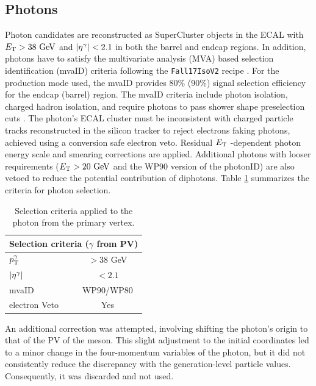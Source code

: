 
\subsection{Photons}\label{subsec:photons}
Photon candidates are reconstructed as SuperCluster objects in the ECAL with $E_\text{T} > 38\ \text{GeV}$ and $\left\lvert\eta^{\gamma}\right\rvert < 2.1$ in both the barrel and endcap regions. In addition, photons have to satisfy the multivariate analysis (MVA) based selection identification (mvaID) criteria following the \verb+Fall17IsoV2+ recipe \cite{CMS:2020uim}. For the production mode used, the mvaID provides 80\% (90\%) signal selection efficiency for the endcap (barrel) region. The mvaID criteria include photon isolation, charged hadron isolation, and require photons to pass shower shape preselection cuts \cite{Rembser:2019ijh}. The photon's ECAL cluster must be inconsistent with charged particle tracks reconstructed in the silicon tracker to reject electrons faking photons, achieved using a conversion safe electron veto. Residual $E_\text{T}$ -dependent photon energy scale and smearing corrections are applied. Additional photons with looser requirements ($E_\text{T} > 20\ \text{GeV}$ and the WP90 version of the photonID) are also vetoed to reduce the potential contribution of diphotons. Table \ref{tab:photon_selection} summarizes the criteria for photon selection.

\begin{table}[!ht]
    \centering
    \begin{tabular}{|l|c|}
        \hline
            \multicolumn{2}{|c|}{\cellcolor{lightgray}Selection criteria ($\gamma$ from PV)}\\ \hline
            $p_\text{T}^{\gamma}$            &$>38$ GeV\\
            $\left\lvert\eta^{\gamma}\right\rvert$       &$<2.1$ \\
            mvaID                       &WP90/WP80 \\
            electron Veto               &Yes \\\hline
        \end{tabular}
    \caption{Selection criteria applied to the photon from the primary vertex.}
    \label{tab:photon_selection}
\end{table}

An additional correction was attempted, involving shifting the photon's origin to that of the PV of the meson. This slight adjustment to the initial coordinates led to a minor change in the four-momentum variables of the photon, but it did not consistently reduce the discrepancy with the generation-level particle values. Consequently, it was discarded and not used.

